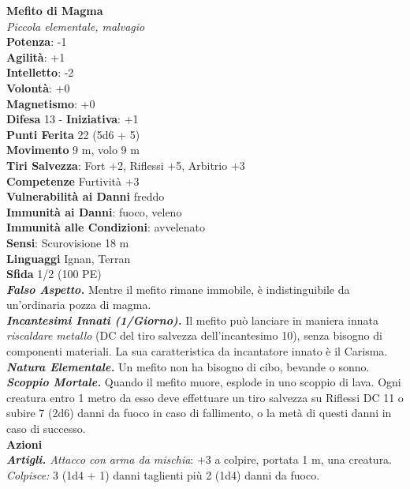 \begin{multicols}{2}
\medskip\textbf{Mefito di Magma}\\
\emph{Piccola elementale, malvagio}\\
\textbf{Potenza}: -1\\
\textbf{Agilità}: +1\\
\textbf{Intelletto}: -2\\
\textbf{Volontà}: +0\\
\textbf{Magnetismo}: +0\\
\textbf{Difesa} 13 - \textbf{Iniziativa}: +1\\
\textbf{Punti Ferita} 22 (5d6 + 5)\\
\textbf{Movimento} 9 m, volo 9 m\\
\textbf{Tiri Salvezza}: Fort +2, Riflessi +5, Arbitrio +3\\
\textbf{Competenze} Furtività +3\\
\textbf{Vulnerabilità ai Danni} freddo\\
\textbf{Immunità ai Danni}: fuoco, veleno\\
\textbf{Immunità alle Condizioni}: avvelenato\\
\textbf{Sensi}: Scurovisione 18 m\\
\textbf{Linguaggi} Ignan, Terran\\
\textbf{Sfida} 1/2 (100 PE)\smallskip\\
\emph{\textbf{Falso Aspetto.}} Mentre il mefito rimane immobile, è indistinguibile da un'ordinaria pozza di magma.\\
\emph{\textbf{Incantesimi Innati (1/Giorno).}} Il mefito può lanciare in maniera innata \emph{riscaldare metallo} (DC del tiro salvezza dell'incantesimo 10), senza bisogno di componenti materiali. La sua caratteristica da incantatore innato è il Carisma.\\
\emph{\textbf{Natura Elementale.}} Un mefito non ha bisogno di cibo, bevande o sonno.\\
\emph{\textbf{Scoppio Mortale.}} Quando il mefito muore, esplode in uno scoppio di lava. Ogni creatura entro 1 metro da esso deve effettuare un tiro salvezza su Riflessi DC 11 o subire 7 (2d6) danni da fuoco in caso di fallimento, o la metà di questi danni in caso di successo.\\
\smallskip\textbf{Azioni}\\
\emph{\textbf{Artigli.} Attacco con arma da mischia}: +3 a colpire, portata 1 m, una creatura.\\
\emph{Colpisce:} 3 (1d4 + 1) danni taglienti più 2 (1d4) danni da fuoco.\\

\end{multicols}
